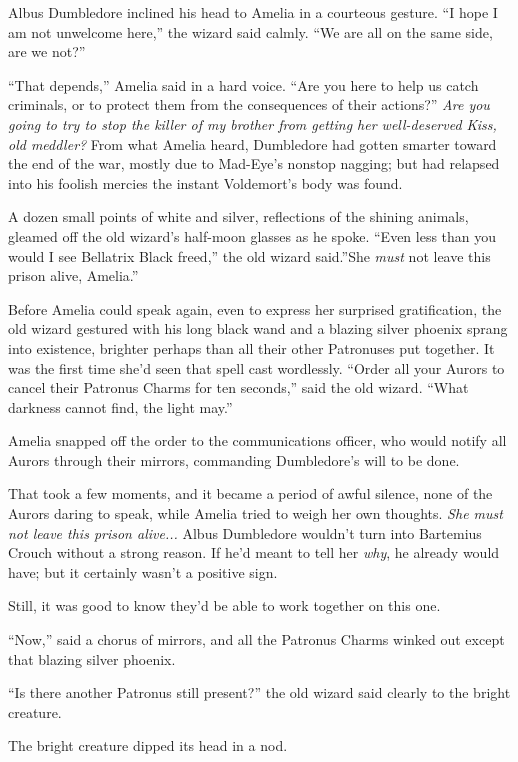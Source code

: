 Albus Dumbledore inclined his head to Amelia in a courteous gesture. ``I
hope I am not unwelcome here,'' the wizard said calmly. ``We are all on
the same side, are we not?''

``That depends,'' Amelia said in a hard voice. ``Are you here to help us
catch criminals, or to protect them from the consequences of their
actions?'' \emph{Are you going to try to stop the killer of my brother
from getting her well-deserved Kiss, old meddler?} From what Amelia
heard, Dumbledore had gotten smarter toward the end of the war, mostly
due to Mad-Eye's nonstop nagging; but had relapsed into his foolish
mercies the instant Voldemort's body was found.

A dozen small points of white and silver, reflections of the shining
animals, gleamed off the old wizard's half-moon glasses as he spoke.
``Even less than you would I see Bellatrix Black freed,'' the old wizard
said.''She \emph{must} not leave this prison alive, Amelia.''

Before Amelia could speak again, even to express her surprised
gratification, the old wizard gestured with his long black wand and a
blazing silver phoenix sprang into existence, brighter perhaps than all
their other Patronuses put together. It was the first time she'd seen
that spell cast wordlessly. ``Order all your Aurors to cancel their
Patronus Charms for ten seconds,'' said the old wizard. ``What darkness
cannot find, the light may.''

Amelia snapped off the order to the communications officer, who would
notify all Aurors through their mirrors, commanding Dumbledore's will to
be done.

That took a few moments, and it became a period of awful silence, none
of the Aurors daring to speak, while Amelia tried to weigh her own
thoughts. \emph{She must not leave this prison alive...} Albus
Dumbledore wouldn't turn into Bartemius Crouch without a strong reason.
If he'd meant to tell her \emph{why}, he already would have; but it
certainly wasn't a positive sign.

Still, it was good to know they'd be able to work together on this one.

``Now,'' said a chorus of mirrors, and all the Patronus Charms winked
out except that blazing silver phoenix.

``Is there another Patronus still present?'' the old wizard said clearly
to the bright creature.

The bright creature dipped its head in a nod.

